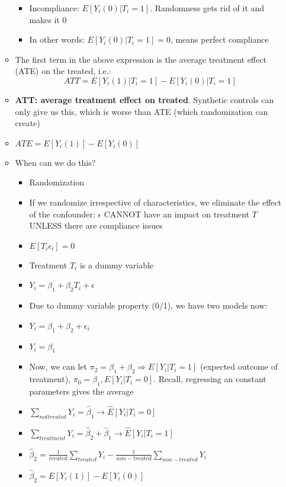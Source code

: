 \documentclass[10pt, oneside]{article}
\begin{document}
\begin{itemize}
\begin{itemize}
\begin{itemize}
            \item Incompliance: $E[Y_i (0) | T_i = 1]$. Randomness gets rid of it and makes it 0
            \item In other words: $E[Y_i (0) | T_i = 1] = 0$, means perfect compliance
        \end{itemize}
        \item The first term in the above expression is the average treatment effect (ATE) on the treated, i.e.:
        \[ ATT = E[Y_i (1)|T_i = 1] - E[Y_i (0) | T_i = 1]\]
        \item \textbf{ATT: average treatment effect on treated}. Synthetic controls can only give us this, which is worse than ATE (which randomization can create)
        \item $ATE = E[Y_i(1)] - E[Y_i(0)]$
        \item When can we do this?
        \begin{itemize}
            \item Randomization
            \item If we randomize irrespective of characteristics, we eliminate the effect of the confounder: $\epsilon$ CANNOT have an impact on treatment $T$ UNLESS there are compliance issues 
            \item $E[T_i \epsilon_i ] = 0$
            \item Treatment $T_i$ is a dummy variable
            \item $Y_i = \beta_1 + \beta_2T_i + \epsilon$
            \item Due to dummy variable property (0/1), we have two models now:
            \item $Y_i = \beta_1 + \beta_2 + \epsilon_i$
            \item $Y_i = \beta_1$
            \item Now, we can let $\pi_2 = \beta_1 + \beta_2 \Rightarrow E[Y_i | T_i = 1]$ (expected outcome of treatment), $\pi_0 = \beta_1, E[Y_i | T_i = 0]$. Recall, regressing an constant parameters gives the average
            \item $\sum_{not treated} Y_i = \hat \beta_1 \rightarrow \hat E[Y_i | T_i = 0]$
            \item $\sum_{treatment} Y_i = \hat \beta_2 + \hat \beta_1 \rightarrow \hat E[Y_i | T_i = 1]$
            \item $\hat \beta_2 = \frac{1}{treated}\sum_{treated} Y_i - \frac{1}{non-treated} \sum_{non-treated} Y_i$
            \item $\hat \beta_2 = E[Y_i (1) ] - E[Y_i (0)]$
        \end{itemize}
    \end{itemize}
\end{itemize}
\end{document}
